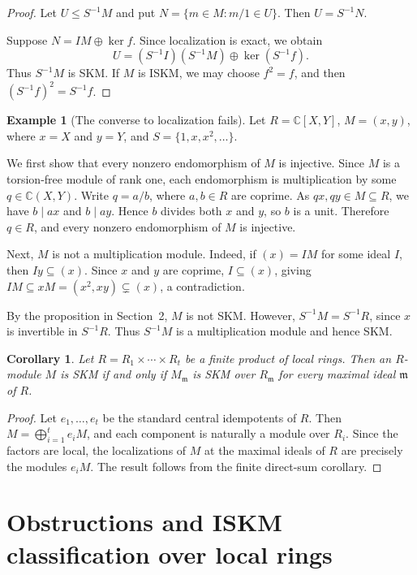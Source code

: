 \documentclass[11pt,a4paper]{article}
\newtheorem{corollary}[theorem]{Corollary}
\theoremstyle{definition}
\newtheorem{example}[theorem]{Example}
\theoremstyle{remark}
\begin{document}
\begin{proof}
Let $U\leq S^{-1}M$ and put $N=\{m\in M:m/1\in U\}$. Then $U=S^{-1}N$.

Suppose $N=IM\oplus\ker f$. Since localization is exact, we obtain
\[
U=(S^{-1}I)(S^{-1}M)\oplus\ker(S^{-1}f).
\]
Thus $S^{-1}M$ is SKM. If $M$ is ISKM, we may choose $f^2=f$, and then $(S^{-1}f)^2=S^{-1}f$.
\end{proof}

\begin{example}[The converse to localization fails]
Let $R=\mathbb C[X,Y]$, $M=(x,y)$, where $x=X$ and $y=Y$, and $S=\{1,x,x^2,\ldots\}$.

We first show that every nonzero endomorphism of $M$ is injective. Since $M$ is a torsion-free module of rank one, each endomorphism is multiplication by some $q\in\mathbb C(X,Y)$. Write $q=a/b$, where $a,b\in R$ are coprime. As $qx,qy\in M\subseteq R$, we have $b\mid ax$ and $b\mid ay$. Hence $b$ divides both $x$ and $y$, so $b$ is a unit. Therefore $q\in R$, and every nonzero endomorphism of $M$ is injective.

Next, $M$ is not a multiplication module. Indeed, if $(x)=IM$ for some ideal $I$, then $Iy\subseteq(x)$. Since $x$ and $y$ are coprime, $I\subseteq(x)$, giving $IM\subseteq xM=(x^2,xy)\subsetneq(x)$, a contradiction.

By the proposition in Section~2, $M$ is not SKM. However, $S^{-1}M=S^{-1}R$, since $x$ is invertible in $S^{-1}R$. Thus $S^{-1}M$ is a multiplication module and hence SKM.
\end{example}


\begin{corollary}
Let $R=R_1\times\cdots\times R_t$ be a finite product of local rings. Then an $R$-module $M$ is SKM if and only if $M_{\mathfrak m}$ is SKM over $R_{\mathfrak m}$ for every maximal ideal $\mathfrak m$ of $R$.
\end{corollary}

\begin{proof}
Let $e_1,\ldots,e_t$ be the standard central idempotents of $R$. Then $M=\bigoplus_{i=1}^t e_iM$, and each component is naturally a module over $R_i$. Since the factors are local, the localizations of $M$ at the maximal ideals of $R$ are precisely the modules $e_iM$. The result follows from the finite direct-sum corollary.
\end{proof}



\section{Obstructions and ISKM classification over local rings}
\end{document}
